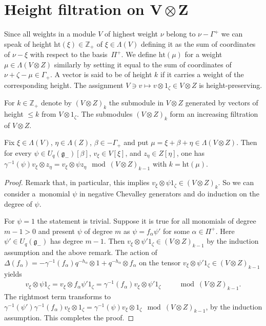 \section[Height filtration on $V\otimes Z$]{Height filtration on $\boldsymbol{V\otimes Z}$}

Since all weights in a module $V$ of highest weight $\nu$ belong to $\nu-\Gamma^+$ we can speak of height $\mathrm{ht}(\xi)\in \mathbb{Z}_+$ of $\xi\in \Lambda(V)$ defining it as the sum of coordinates of $\nu-\xi$ with respect to the basis~$\Pi^+$. We define $\mathrm{ht}(\mu)$ for a weight $\mu\in \Lambda(V\otimes Z)$ similarly by setting it equal to the sum of coordinates of $\nu+\zeta-\mu\in \Gamma_+$. A vector is said to be of height $k$ if it carries a weight of the corresponding height. The assignment $V\ni v\mapsto v\otimes 1_\zeta\in V\otimes Z$ is height-preserving.

For $k\in \mathbb{Z}_+$ denote by $(V\otimes Z)_k$ the submodule in $V\otimes Z$ generated by vectors of height $\leqslant k$ from $V\otimes 1_\zeta$. The submodules $(V\otimes Z)_k$ form an increasing filtration of $V\otimes Z$.
\begin{Lemma}\label{diagonal}Fix $\xi\in \Lambda(V)$, $\eta\in \Lambda(Z)$, $\beta\in -\Gamma_+$ and put $\mu=\xi+\beta+\eta \in\Lambda(V\otimes Z)$. Then for every $\psi \in U_q(\mathfrak{g}_-)[\beta]$, $v_\xi\in V[\xi]$, and $z_\eta\in Z[\eta]$, one has $\gamma^{-1}(\psi) v_\xi\otimes z_\eta = v_\xi\otimes \psi z_\eta \mod (V\otimes Z)_{k-1}$ with $k=\mathrm{ht}(\mu)$.
\end{Lemma}
\begin{proof}Remark that, in particular, this implies $v_\xi\otimes \psi 1_\zeta \in (V\otimes Z)_{k}$. So we can consider a~monomial $\psi$ in negative Chevalley generators and do induction on the degree of $\psi$.

For $\psi=1$ the statement is trivial. Suppose it is true for all monomials of degree $m-1>0$ and present $\psi$ of degree $m$ as $\psi= f_{\alpha} \psi'$ for some $\alpha \in \Pi^+$. Here $\psi'\in U_q(\mathfrak{g}_-)$ has
degree $m-1$. Then $v_\xi\otimes \psi' 1_\zeta \in (V\otimes Z)_{k-1}$ by the induction assumption and the above remark. The action of $\Delta(f_\alpha)=- \gamma^{-1}(f_{\alpha} )q^{-h_\alpha}\otimes 1+q^{-h_\alpha}\otimes f_\alpha$ on the tensor $v_\xi\otimes \psi' 1_\zeta\in (V\otimes Z)_{k-1}$ yields
\begin{gather*}
 v_\xi\otimes\psi 1_\zeta= v_\xi\otimes f_\alpha \psi' 1_\zeta=\gamma^{-1}(f_{\alpha}) v_\xi\otimes \psi' 1_\zeta \qquad \mod (V\otimes Z)_{k-1}.
\end{gather*}
The rightmost term transforms to $\gamma^{-1}(\psi')\gamma^{-1}(f_{\alpha}) v_\xi\otimes 1_\zeta=\gamma^{-1}(\psi) v_\xi\otimes 1_\zeta \mod(V\otimes Z)_{k-1}$, by the induction assumption. This completes the proof.
\end{proof}

